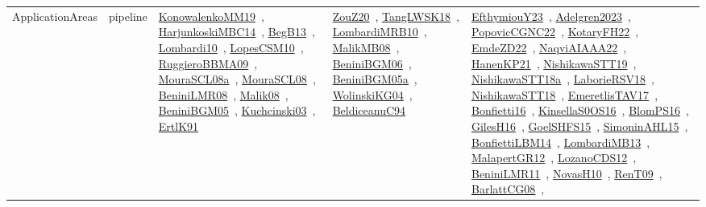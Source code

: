 {\begin{longtable}{lp{3cm}>{\raggedright\arraybackslash}p{6cm}>{\raggedright\arraybackslash}p{6cm}>{\raggedright\arraybackslash}p{8cm}}
\index{pipeline}\index{ApplicationAreas!pipeline}ApplicationAreas & pipeline & \href{../works/KonowalenkoMM19.pdf}{KonowalenkoMM19}~\cite{KonowalenkoMM19}, \href{../works/HarjunkoskiMBC14.pdf}{HarjunkoskiMBC14}~\cite{HarjunkoskiMBC14}, \href{../works/BegB13.pdf}{BegB13}~\cite{BegB13}, \href{../works/Lombardi10.pdf}{Lombardi10}~\cite{Lombardi10}, \href{../works/LopesCSM10.pdf}{LopesCSM10}~\cite{LopesCSM10}, \href{../works/RuggieroBBMA09.pdf}{RuggieroBBMA09}~\cite{RuggieroBBMA09}, \href{../works/MouraSCL08a.pdf}{MouraSCL08a}~\cite{MouraSCL08a}, \href{../works/MouraSCL08.pdf}{MouraSCL08}~\cite{MouraSCL08}, \href{../works/BeniniLMR08.pdf}{BeniniLMR08}~\cite{BeniniLMR08}, \href{../works/Malik08.pdf}{Malik08}~\cite{Malik08}, \href{../works/BeniniBGM05.pdf}{BeniniBGM05}~\cite{BeniniBGM05}, \href{../works/Kuchcinski03.pdf}{Kuchcinski03}~\cite{Kuchcinski03}, \href{../works/ErtlK91.pdf}{ErtlK91}~\cite{ErtlK91} & \href{../works/ZouZ20.pdf}{ZouZ20}~\cite{ZouZ20}, \href{../works/TangLWSK18.pdf}{TangLWSK18}~\cite{TangLWSK18}, \href{../works/LombardiMRB10.pdf}{LombardiMRB10}~\cite{LombardiMRB10}, \href{../works/MalikMB08.pdf}{MalikMB08}~\cite{MalikMB08}, \href{../works/BeniniBGM06.pdf}{BeniniBGM06}~\cite{BeniniBGM06}, \href{../works/BeniniBGM05a.pdf}{BeniniBGM05a}~\cite{BeniniBGM05a}, \href{../works/WolinskiKG04.pdf}{WolinskiKG04}~\cite{WolinskiKG04}, \href{../works/BeldiceanuC94.pdf}{BeldiceanuC94}~\cite{BeldiceanuC94} & \href{../works/EfthymiouY23.pdf}{EfthymiouY23}~\cite{EfthymiouY23}, \href{../works/Adelgren2023.pdf}{Adelgren2023}~\cite{Adelgren2023}, \href{../works/PopovicCGNC22.pdf}{PopovicCGNC22}~\cite{PopovicCGNC22}, \href{../works/KotaryFH22.pdf}{KotaryFH22}~\cite{KotaryFH22}, \href{../works/EmdeZD22.pdf}{EmdeZD22}~\cite{EmdeZD22}, \href{../works/NaqviAIAAA22.pdf}{NaqviAIAAA22}~\cite{NaqviAIAAA22}, \href{../works/HanenKP21.pdf}{HanenKP21}~\cite{HanenKP21}, \href{../works/NishikawaSTT19.pdf}{NishikawaSTT19}~\cite{NishikawaSTT19}, \href{../works/NishikawaSTT18a.pdf}{NishikawaSTT18a}~\cite{NishikawaSTT18a}, \href{../works/LaborieRSV18.pdf}{LaborieRSV18}~\cite{LaborieRSV18}, \href{../works/NishikawaSTT18.pdf}{NishikawaSTT18}~\cite{NishikawaSTT18}, \href{../works/EmeretlisTAV17.pdf}{EmeretlisTAV17}~\cite{EmeretlisTAV17}, \href{../works/Bonfietti16.pdf}{Bonfietti16}~\cite{Bonfietti16}, \href{../works/KinsellaS0OS16.pdf}{KinsellaS0OS16}~\cite{KinsellaS0OS16}, \href{../works/BlomPS16.pdf}{BlomPS16}~\cite{BlomPS16}, \href{../works/GilesH16.pdf}{GilesH16}~\cite{GilesH16}, \href{../works/GoelSHFS15.pdf}{GoelSHFS15}~\cite{GoelSHFS15}, \href{../works/SimoninAHL15.pdf}{SimoninAHL15}~\cite{SimoninAHL15}, \href{../works/BonfiettiLBM14.pdf}{BonfiettiLBM14}~\cite{BonfiettiLBM14}, \href{../works/LombardiMB13.pdf}{LombardiMB13}~\cite{LombardiMB13}, \href{../works/MalapertGR12.pdf}{MalapertGR12}~\cite{MalapertGR12}, \href{../works/LozanoCDS12.pdf}{LozanoCDS12}~\cite{LozanoCDS12}, \href{../works/BeniniLMR11.pdf}{BeniniLMR11}~\cite{BeniniLMR11}, \href{../works/NovasH10.pdf}{NovasH10}~\cite{NovasH10}, \href{../works/RenT09.pdf}{RenT09}~\cite{RenT09}, \href{../works/BarlattCG08.pdf}{BarlattCG08}~\cite{BarlattCG08}, 
\end{longtable}}
